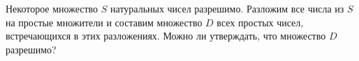 Некоторое множество $S$ натуральных чисел разрешимо. Разложим все числа из $S$ на простые множители и
составим множество $D$ всех простых чисел, встречающихся в этих разложениях. Можно ли утверждать, что
множество $D$ разрешимо?
